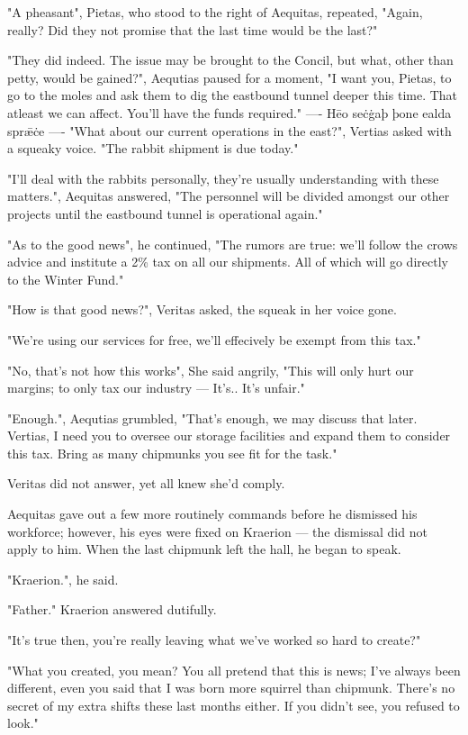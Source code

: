"A pheasant", Pietas, who stood to the right of Aequitas, repeated, "Again, really? Did they not promise that the last time would be the last?"  

"They did indeed. The issue may be brought to the Concil, but what, other than petty, would be gained?", Aequtias paused for a moment, "I want you, Pietas, to go to the moles and ask them to dig the eastbound tunnel deeper this time. That atleast we can affect. You'll have the funds required."
----
Hēo seċġaþ þone ealda sprǣċe
----
"What about our current operations in the east?", Vertias asked with a squeaky voice. "The rabbit shipment is due today." 

"I'll deal with the rabbits personally, they're usually understanding with these matters.", Aequitas answered, "The personnel will be divided amongst our other projects until the eastbound tunnel is operational again."

"As to the good news", he continued, "The rumors are true: we'll follow the crows advice and institute a 2\% tax on all our shipments. All of which will go directly to the Winter Fund."

"How is that good news?", Veritas asked, the squeak in her voice gone.

"We're using our services for free, we'll effecively be exempt from this tax."

"No, that's not how this works", She said angrily, "This will only hurt our margins; to only tax our industry — It's.. It's unfair."

"Enough.", Aequtias grumbled, "That's enough, we may discuss that later. Vertias, I need you to oversee our storage facilities and expand them to consider this tax. Bring as many chipmunks you see fit for the task." 

Veritas did not answer, yet all knew she'd comply.

Aequitas gave out a few more routinely commands before he dismissed his workforce; however, his eyes were fixed on Kraerion — the dismissal did not apply to him. When the last chipmunk left the hall, he began to speak.

"Kraerion.", he said.

"Father." Kraerion answered dutifully.

"It's true then, you're really leaving what we've worked so hard to create?"

"What you created, you mean? You all pretend that this is news; I've always been different, even you said that I was born more squirrel than chipmunk. There's no secret of my extra shifts these last months either. If you didn't see, you refused to look."

